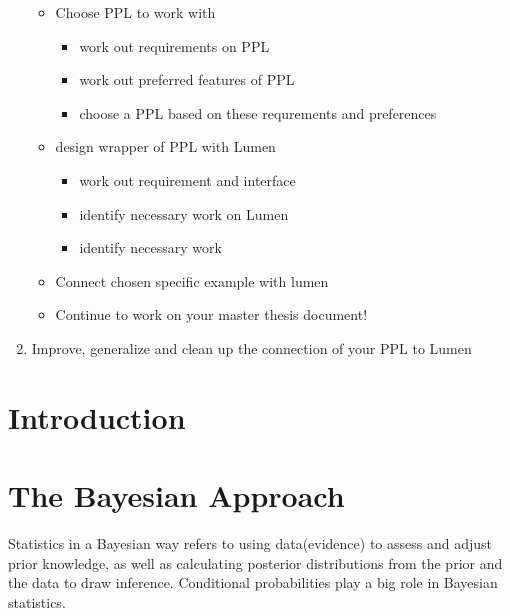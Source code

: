 \documentclass{article}
\begin{document}
\begin{enumerate}
\begin{itemize}
		\item Choose PPL to work with
		\begin {itemize}
		\item work out requirements on PPL
		\item work out preferred features of PPL
		\item choose a PPL based on these requrements and preferences
	\end{itemize}
	\item design wrapper of PPL with Lumen
	\begin{itemize}
		\item work out requirement and interface
		\item identify necessary work on Lumen
		\item identify necessary work
	\end{itemize}
	\item Connect chosen specific example with lumen
	\item Continue to work on your master thesis document!
\end{itemize}
\item Improve, generalize and clean up the connection of your PPL to Lumen
\end{enumerate}

\section{Introduction}

\section{The Bayesian Approach}

Statistics in a Bayesian way refers to using data(evidence) to assess and adjust prior knowledge, as well as calculating posterior distributions from the prior and the data to draw inference. Conditional probabilities play a big role in Bayesian statistics.
\end{document}
